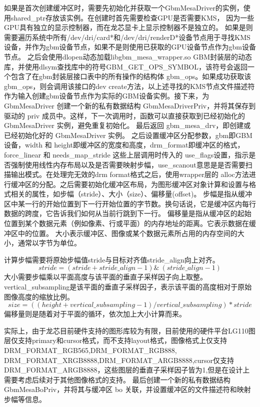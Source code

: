 如果是首次创建缓冲区时，需要先初始化并获取一个GbmMesaDriver的实例，使用shared\_ptr存放该实例。在创建时首先需要检查GPU是否需要KMS，
因为一些GPU具有独立的显示控制器，而在龙芯显卡上显示控制器不是独立的。
如果是则需要遍历系统中所有/dev/dri/card*和/dev/dri/renderD*设备节点用于寻找KMS设备，并作为gbm设备节点，如果不是则使用已获取的GPU设备节点作为gbm设备节点。
之后会使用dlopen动态加载libgbm\_mesa\_wrapper.so GBM封装层的动态库，并使用dlsym查找库中的符号GBM\_GET\_OPS\_SYMBOL，该符号会返回一个包含了在gbm封装层接口表中的所有操作的结构体
gbm\_ops。如果成功获取该gbm\_ops，则会调用该接口的dev create方法，以上述寻找的KMS节点文件描述符作为输入创建gbm设备节点作为实际的GBM设备实例。接下来，为 GbmMesaDriver 
创建一个新的私有数据结构 GbmMesaDriverPriv，并将其保存到驱动的 priv 成员中。这样，下一次调用时，函数可以直接获取到已经初始化的 GbmMesaDriver 实例，避免重复初始化。
最后返回 gbm\_mesa\_drv，即创建或已经初始化好的 GbmMesaDriver 实例。
之后设置缓冲区分配参数，gbm即GBM设备，width 和 height即缓冲区的宽度和高度，drm\_format即缓冲区的格式，force\_linear 和 needs\_map\_stride
这些上层调用时传入的 use\_flags设置，指示是否强制使用线性内存布局以及是否需要映射步幅，use\_scanout意思是是否需要扫描输出模式。在处理完无效的drm format格式之后，使用wrapper层的
alloc方法进行缓冲区的分配。之后需要初始化缓冲区布局，为图形缓冲区对象计算和设置与格式相关的属性，如步幅（stride）、大小（size）、偏移量(offset)。
步幅是指从缓冲区中某一行的开始位置到下一行开始位置的字节数。换句话说，它是缓冲区内每行数据的跨度，它告诉我们如何从当前行跳到下一行。
偏移量是指从缓冲区的起始位置到某个数据元素（例如像素、行或平面）的内存地址的距离。它表示数据在缓冲区中的位置。
大小表示缓冲区、图像或某个数据元素所占用的内存空间的大小，通常以字节为单位。

计算步幅需要将原始步幅值stride与目标对齐值stride\_align向上对齐。
\begin{equation}
  stride=(stride+stride\_align-1)\&~(stride\_align-1)
\end{equation}
大小需要步幅乘以平面高度与该平面的垂直子采样因子向上取整。vertical\_subsampling是该平面的垂直子采样因子，表示该平面的高度相对于原始图像高度的缩放比例。
\begin{equation}
  size=((height+vertical\_subsampling-1)/vertical\_subsampling)*stride
\end{equation}
偏移量则是随着对于平面的循环，依次加上大小计算而来。

实际上，由于龙芯目前硬件支持的图形库较为有限，目前使用的硬件平台LG110图层仅支持primary和cursor格式，而不支持layout格式，图像格式上仅支持DRM\_FORMAT\_RGB565,DRM\_FORMAT\_RGB888,
DRM\_FORMAT\_XRGB8888,DRM\_FORMAT\_ARGB8888,cursor仅支持DRM\_FORMAT\_ARGB8888，这些图层的垂直子采样因子皆为1,但是在设计上需要考虑后续对于其他图像格式的支持。
最后创建一个新的私有数据结构 GbmMesaBoPriv，并将其与缓冲区 bo 关联，并设置缓冲区的文件描述符和映射步幅等信息。

